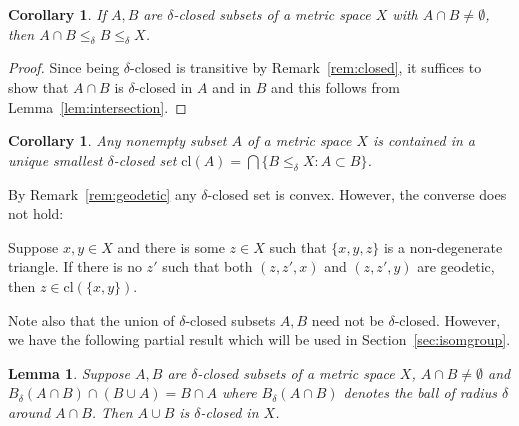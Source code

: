 \documentclass{amsart}
\renewcommand{\d}{\delta}
\newcommand{\cl}{\mathrm{cl}}
\newtheorem{lemma}[defi]{Lemma}
\newtheorem{corollary}[defi]{Corollary}
\begin{document}
\begin{corollary}\label{cor:submodular}
If $A, B$ are $\d$-closed subsets of a  metric space $X$ with $A\cap B\neq\emptyset$, then $A\cap B\leq_\d B\leq_\d X$. 
\end{corollary}
\begin{proof}
Since being   $\d$-closed is transitive by Remark~\ref{rem:closed}, it suffices to show that $A\cap B$ is  $\d$-closed in $A$ and in $B$ and this follows from Lemma~\ref{lem:intersection}. 
\end{proof}

\begin{corollary}\label{cor:closure}
Any nonempty subset $A$ of a metric space $X$ is contained in a unique smallest   $\d$-closed set $\cl(A)=\bigcap \{B\leq_\d X\colon A\subset B\}$.
\end{corollary}

By Remark~\ref{rem:geodetic} any   $\d$-closed set is convex. However, the converse does not hold:

Suppose $x, y\in X$ and there is some $z\in X$ such that $\{x,y,z\}$ is a non-degenerate triangle. If there is no $z'$ such that both $(z,z',x)$ and $(z,z',y)$ are geodetic,  then $z\in\cl(\{x,y\})$. 


Note also that the union of  $\d$-closed subsets $A, B$ need not be  $\d$-closed. However, we have the following partial result which will be used in Section~\ref{sec:isomgroup}.

\begin{lemma}\label{lem:strong union}
Suppose $A, B$ are  $\d$-closed subsets of a metric space $X$, $A\cap B\neq\emptyset$ and $B_\d(A\cap B)\cap (B\cup A)=B\cap A$ where $B_\d(A\cap B)$ denotes the ball of radius $\d$ around $A\cap B$. Then $A\cup B$ is  $\d$-closed in $X$.
\end{lemma}
\end{document}
